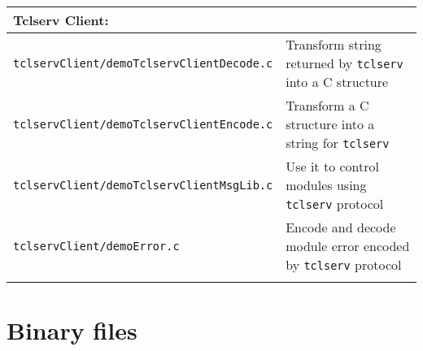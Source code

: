 \begin{center}
\begin{tabularx}{\linewidth}{|l|X|}
 \hline
 \multicolumn{2}{|l|}{Tclserv Client:} \\
 \hline
 \texttt{tclservClient/demoTclservClientDecode.c}  & Transform string returned by \texttt{tclserv} into a C structure\\
 \texttt{tclservClient/demoTclservClientEncode.c}  & Transform a C structure into a string for \texttt{tclserv} \\
 \texttt{tclservClient/demoTclservClientMsgLib.c} & Use it to control modules using \texttt{tclserv} protocol\\
 \texttt{tclservClient/demoError.c} & Encode and decode module error encoded
 by \texttt{tclserv} protocol \\
 \hline
 \multicolumn{2}{l}{} \\
 \end{tabularx}
\end{center}

\vfill\eject
\section{Binary files}

